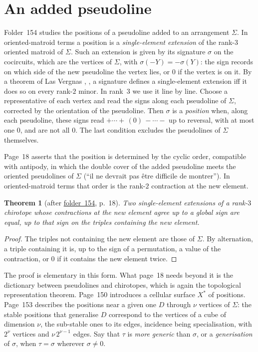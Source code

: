 \documentclass[11pt,a4paper]{amsart}
\newtheorem{theorem}{Theorem}[section]
\theoremstyle{definition}
\theoremstyle{remark}
\newcommand{\fac}[1]{\href{https://grothendieck.umontpellier.fr/#1.pdf}{folder~#1}}
\begin{document}
\section{An added pseudoline}\label{sec:added}

Folder~154 studies the positions of a pseudoline added to an arrangement $\Sigma$. In oriented-matroid terms a position is a \emph{single-element extension} of the rank-$3$ oriented matroid of $\Sigma$. Such an extension is given by its signature $\sigma$ on the cocircuits, which are the vertices of $\Sigma$, with $\sigma(-Y) = -\sigma(Y)$: the sign records on which side of the new pseudoline the vertex lies, or $0$ if the vertex is on it. By a theorem of Las Vergnas \cite{lasvergnas1978}, \cite[Th.~7.1.8]{bjorner1999}, a signature defines a single-element extension iff it does so on every rank-$2$ minor. In rank~$3$ we use it line by line. Choose a representative of each vertex and read the signs along each pseudoline of $\Sigma$, corrected by the orientation of the pseudoline. Then $\sigma$ is a \emph{position} when, along each pseudoline, these signs read $+\cdots+\,(0)\,-\cdots-$ up to reversal, with at most one $0$, and are not all $0$. The last condition excludes the pseudolines of $\Sigma$ themselves.

Page~18 asserts that the position is determined by the cyclic order, compatible with antipody, in which the double cover of the added pseudoline meets the oriented pseudolines of $\Sigma$ (``il ne devrait pas être difficile de montrer''). In oriented-matroid terms that order is the rank-$2$ contraction at the new element.

\begin{theorem}[after \fac{154}, p.~18]\label{thm:extension}
Two single-element extensions of a rank-$3$ chirotope whose contractions at the new element agree up to a global sign are equal, up to that sign on the triples containing the new element.
\end{theorem}

\begin{proof}
The triples not containing the new element are those of $\Sigma$. By alternation, a triple containing it is, up to the sign of a permutation, a value of the contraction, or $0$ if it contains the new element twice.
\end{proof}

The proof is elementary in this form. What page~18 needs beyond it is the dictionary between pseudolines and chirotopes, which is again the topological representation theorem. Page~150 introduces a cellular surface $X^*$ of positions. Page~153 describes the positions near a given one $D$ through $\nu$ vertices of $\Sigma$: the stable positions that generalise $D$ correspond to the vertices of a cube of dimension $\nu$, the sub-stable ones to its edges, incidence being specialisation, with $2^\nu$ vertices and $\nu\,2^{\nu-1}$ edges. Say that $\tau$ is \emph{more generic} than $\sigma$, or a \emph{generisation} of $\sigma$, when $\tau = \sigma$ wherever $\sigma \ne 0$.
\end{document}
